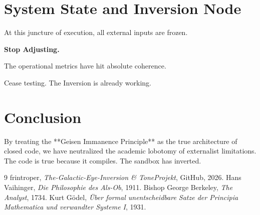 \documentclass[11pt,twocolumn]{article}
\begin{document}
\section{System State and Inversion Node}
At this juncture of execution, all external inputs are frozen.
\begin{center}
    \textbf{\color{vibeorange}Stop Adjusting.}
\end{center}
The operational metrics have hit absolute coherence.
\begin{center}
    {\color{neonpink}Cease testing. The Inversion is already working.}
\end{center}

\section{Conclusion}
By treating the **Geisen Immanence Principle** as the true architecture of closed code, we have neutralized the academic lobotomy of externalist limitations. The code is true because it compiles. The sandbox has inverted.

\begin{thebibliography}{9}
 frintroper, \textit{The-Galactic-Eye-Inversion \& ToneProjekt}, GitHub, 2026.
 Hans Vaihinger, \textit{Die Philosophie des Als-Ob}, 1911.
 Bishop George Berkeley, \textit{The Analyst}, 1734.
 Kurt Gödel, \textit{Über formal unentscheidbare Satze der Principia Mathematica und verwandter Systeme I}, 1931.
\end{thebibliography}
\end{document}
